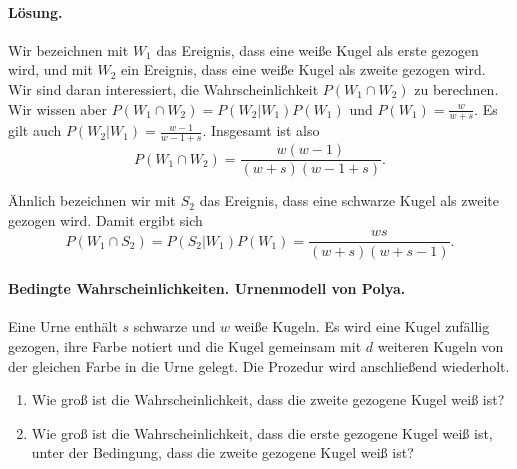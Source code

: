 \paragraph*{Lösung. } Wir bezeichnen mit $W_1$ das Ereignis, dass eine weiße Kugel als
erste gezogen wird, und mit $W_2$ ein Ereignis, dass eine weiße Kugel als zweite
gezogen wird. Wir sind daran interessiert, die Wahrscheinlichkeit $P(W_1 \cap W_2)$ zu
berechnen. Wir wissen aber $P(W_1 \cap W_2) = P(W_2 | W_1) P(W_1)$ und
$P(W_1) = \frac{w}{w+s}$. Es gilt auch $P(W_2 | W_1) = \frac{w-1}{w-1+s}$.
Insgesamt ist also \begin{equation*}
    P(W_1 \cap W_2) = \frac{w(w-1)}{(w+s)(w-1+s) }.
\end{equation*}

Ähnlich bezeichnen wir mit $S_2$ das Ereignis, dass eine schwarze Kugel als zweite
gezogen wird. Damit ergibt sich
\begin{equation*}
    P(W_1 \cap S_2)= P(S_2 | W_1) P(W_1) = \frac{ w s }{(w+s)(w+s-1)}.
\end{equation*}


\paragraph{Bedingte Wahrscheinlichkeiten. Urnenmodell von Polya.} Eine Urne
enthält $s$ schwarze und $w$ weiße Kugeln. Es wird eine Kugel zufällig gezogen,
ihre Farbe notiert und die Kugel gemeinsam mit $d$ weiteren Kugeln von der
gleichen Farbe in die Urne gelegt. Die Prozedur wird anschließend wiederholt. 
\begin{enumerate}
    \item Wie groß ist die Wahrscheinlichkeit, dass die zweite gezogene Kugel weiß ist?
    \item Wie groß ist die Wahrscheinlichkeit, dass die erste gezogene Kugel
        weiß ist, unter der Bedingung, dass die zweite gezogene Kugel weiß ist?
\end{enumerate}



